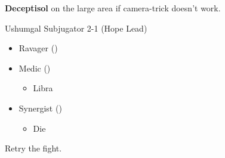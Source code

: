 \textbf{Deceptisol} on the large area if camera-trick doesn't work.
\renewcommand{\first}{[1] Ravager (\rav)}
\renewcommand{\second}{[2] Medic (\med)}
\renewcommand{\third}{[3] Synergist (\syn)}
\begin{battle}{Ushumgal Subjugator 2-1 (Hope Lead)}
\begin{itemize}
    \item \first
    \item \second
    \begin{itemize}
        \item Libra
    \end{itemize}
    \item \third
    \begin{itemize}
        \item Die
    \end{itemize}
\end{itemize}
\end{battle}
Retry the fight.


